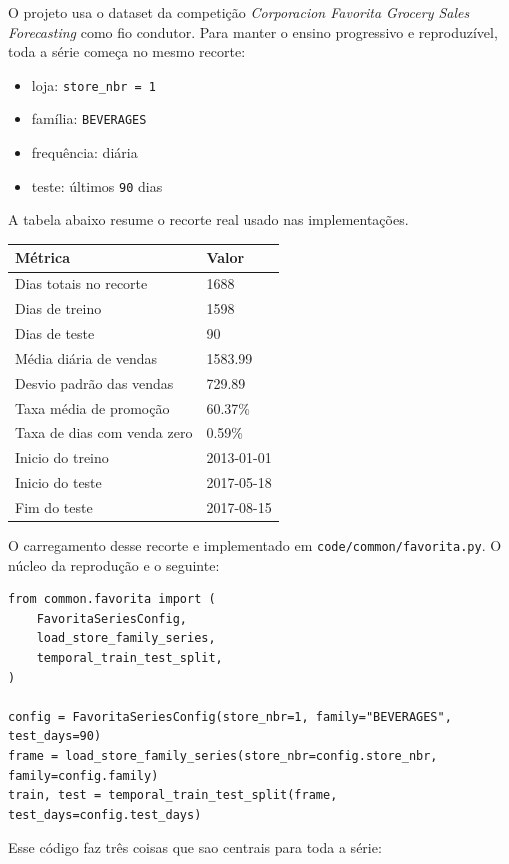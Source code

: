 \documentclass[12pt]{article}
\providecommand{\tightlist}{%
          \setlength{\itemsep}{0pt}\setlength{\parskip}{0pt}}
\begin{document}
O projeto usa o dataset da competição \emph{Corporacion Favorita Grocery Sales Forecasting} como fio condutor. Para manter o ensino progressivo e reproduzível, toda a série começa no mesmo recorte:

\begin{itemize}
\tightlist
\item
  loja: \texttt{store\_nbr\ =\ 1}
\item
  família: \texttt{BEVERAGES}
\item
  frequência: diária
\item
  teste: últimos \texttt{90} dias
\end{itemize}

A tabela abaixo resume o recorte real usado nas implementações.

\begin{longtable}[]{@{}ll@{}}
\toprule\noalign{}
Métrica & Valor \\
\midrule\noalign{}
\endhead
\bottomrule\noalign{}
\endlastfoot
Dias totais no recorte & 1688 \\
Dias de treino & 1598 \\
Dias de teste & 90 \\
Média diária de vendas & 1583.99 \\
Desvio padrão das vendas & 729.89 \\
Taxa média de promoção & 60.37\% \\
Taxa de dias com venda zero & 0.59\% \\
Inicio do treino & 2013-01-01 \\
Inicio do teste & 2017-05-18 \\
Fim do teste & 2017-08-15 \\
\end{longtable}

O carregamento desse recorte e implementado em \texttt{code/common/favorita.py}. O núcleo da reprodução e o seguinte:

\begin{verbatim}
from common.favorita import (
    FavoritaSeriesConfig,
    load_store_family_series,
    temporal_train_test_split,
)

config = FavoritaSeriesConfig(store_nbr=1, family="BEVERAGES", test_days=90)
frame = load_store_family_series(store_nbr=config.store_nbr, family=config.family)
train, test = temporal_train_test_split(frame, test_days=config.test_days)
\end{verbatim}

Esse código faz três coisas que sao centrais para toda a série:
\end{document}
